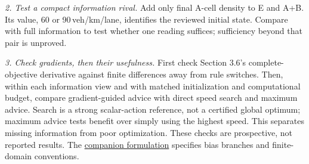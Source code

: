 \documentclass[10pt,a4paper]{article}
\begin{document}
\emph{2. Test a compact information rival.} Add only final A-cell density
to E and A+B. Its value, 60 or 90\,veh/km/lane, identifies the reviewed
initial state. Compare with full information to test whether one reading
suffices; sufficiency beyond that pair is unproved.

\emph{3. Check gradients, then their usefulness.} First check Section 3.6's
complete-objective derivative against finite differences away from rule
switches. Then, within each information view and with matched initialization
and computational budget, compare gradient-guided advice with direct speed
search and maximum advice. Search is a strong scalar-action reference,
not a certified global optimum; maximum advice tests benefit over simply
using the highest speed. This separates missing information from poor
optimization. These checks are prospective, not reported results.
The \href{vsl_joined_candidate_contract_and_qualification.pdf}{companion formulation}
specifies bias branches and finite-domain conventions.
\end{document}
